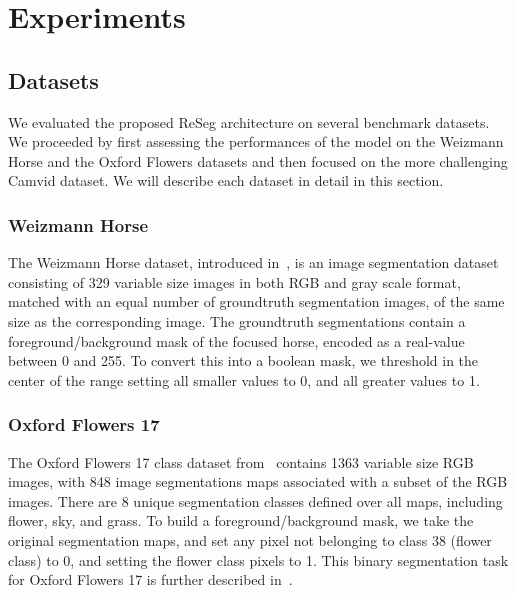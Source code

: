 \documentclass[times,art10,twocolumn,latex8]{article}
\begin{document}
\section{Experiments}\label{sec:Experiments}

\subsection{Datasets}
We evaluated the proposed ReSeg architecture on several benchmark datasets.
We proceeded by first assessing the performances of the model on the Weizmann
Horse and the Oxford Flowers datasets and then focused on the more challenging
Camvid dataset. We will describe each dataset in detail in this section.

\subsubsection{Weizmann Horse}
The Weizmann Horse dataset, introduced in~\cite{Borenstein04combiningtop-down},
is an image
segmentation dataset consisting of 329 variable size images in both RGB and
gray scale
format, matched with an equal number of groundtruth segmentation images, of
the same size as the corresponding image.
The groundtruth segmentations contain a foreground/background mask of the
focused horse, encoded as a real-value between 0 and 255. To convert this into
a boolean mask, we threshold in the center of the range setting all smaller
values to 0, and all greater values to 1.




\subsubsection{Oxford Flowers 17}
The Oxford Flowers 17 class dataset from~\cite{Nilsback06} contains 1363
variable size RGB images, with 848 image segmentations maps associated with
a subset of
the RGB images. There are 8 unique segmentation classes defined over all maps,
including flower, sky, and grass. To build a foreground/background mask,
we take the original segmentation maps, and set any pixel not belonging to
class 38 (flower class) to 0, and setting the flower class pixels to 1.
This binary segmentation task for Oxford Flowers 17 is further described
in~\cite{Xiaomeng14}.
\end{document}
